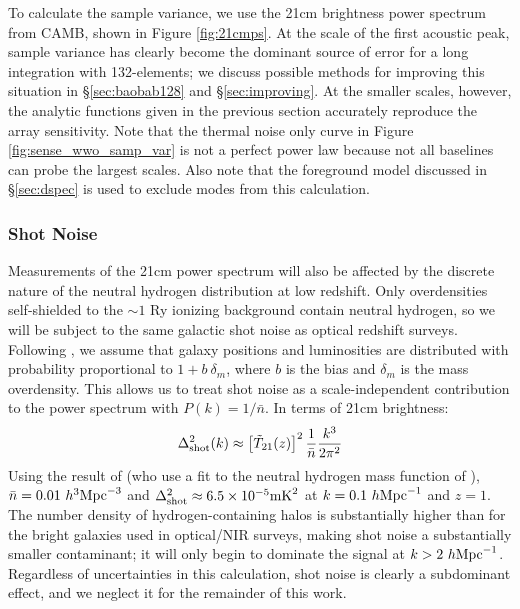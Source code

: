 \documentclass[10pt,iop]{emulateapj}
\begin{document}
To calculate the sample variance,
we use the 21cm brightness power spectrum from CAMB, shown in Figure \ref{fig:21cmps}.
At the scale of the first acoustic peak, sample variance has clearly become the dominant source 
of error for a long integration with 132-elements; we discuss possible methods for improving this
situation in \S\ref{sec:baobab128} and \S\ref{sec:improving}.  At the smaller scales, however, the analytic functions given in
the previous section accurately reproduce the array sensitivity.  Note that the thermal noise
only curve in Figure \ref{fig:sense_wwo_samp_var} is not a perfect power law because not all 
baselines can probe the largest scales.  Also note that the foreground model discussed in
\S\ref{sec:dspec} is used to exclude modes from this calculation.

\subsubsection{Shot Noise}
\label{sec:shot_noise}

Measurements of the 21cm power spectrum will also be affected by the discrete nature of
the neutral hydrogen distribution at low redshift.  Only overdensities self-shielded to the $\sim1$ Ry ionizing background
contain neutral hydrogen, so we will be subject to the same galactic shot noise as
optical redshift surveys.  Following \citet{seo_et_al_2010}, we assume that galaxy
positions and luminosities are distributed with probability proportional to
$1+b~\delta_m$, where $b$ is the bias and $\delta_m$ is the mass overdensity.  This allows
us to treat shot noise as a scale-independent contribution to the power spectrum
with $P(k) = 1/\bar{n}$.  In terms of 21cm brightness:
\begin{align}
\Delta^2_{\rm shot}(k) \approx \left[\tilde{T}_{21}(z)\right]^2 \frac{1}{\bar{n}} \frac{k^3}{2\pi^2}
\end{align}
Using the result of \citet{seo_et_al_2010} (who use a fit to the neutral hydrogen mass
function of \citealt{zwaan_et_al_2005}), $\bar{n} = 0.01~h^{3}\rm{Mpc}^{-3}$ and 
$\Delta^2_{\rm shot} \approx 6.5 \times 10^{-5} \rm{mK}^2$ at $k = 0.1~h\rm{Mpc}^{-1}$ and 
$z = 1$.  The number density of hydrogen-containing halos is substantially higher than for
the bright galaxies used in optical/NIR surveys, making shot noise a substantially smaller 
contaminant; it will only begin to dominate the signal
at $k > 2~h\rm{Mpc}^{-1}$.
Regardless of uncertainties in this calculation, shot noise is clearly
a subdominant effect, and we neglect it for the remainder of this work.
\end{document}
